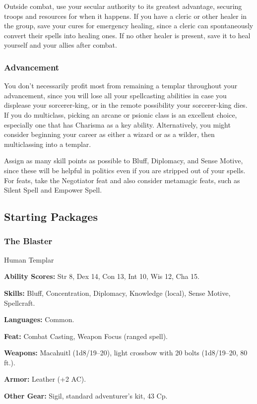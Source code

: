 Outside combat, use your secular authority to its greatest advantage, securing troops and resources for when it happens. If you have a cleric or other healer in the group, save your cures for emergency healing, since a cleric can spontaneously convert their spells into healing ones. If no other healer is present, save it to heal yourself and your allies after combat.

\subsubsection{Advancement}
You don't necessarily profit most from remaining a templar throughout your advancement, since you will lose all your spellcasting abilities in case you displease your sorcerer‐king, or in the remote possibility your sorcerer‐king dies. If you do multiclass, picking an arcane or psionic class is an excellent choice, especially one that has Charisma as a key ability. Alternatively, you might consider beginning your career as either a wizard or as a wilder, then multiclassing into a templar.

Assign as many skill points as possible to Bluff, Diplomacy, and Sense Motive, since these will be helpful in politics even if you are stripped out of your spells. For feats, take the Negotiator feat and also consider metamagic feats, such as Silent Spell and Empower Spell.

\subsection{Starting Packages}
\subsubsection{The Blaster}
Human Templar

\textbf{Ability Scores:} Str 8, Dex 14, Con 13, Int 10, Wis 12, Cha 15.

\textbf{Skills:} Bluff, Concentration, Diplomacy, Knowledge (local), Sense Motive, Spellcraft.

\textbf{Languages:} Common.

\textbf{Feat:} Combat Casting, Weapon Focus (ranged spell).

\textbf{Weapons:} Macahuitl (1d8/19–20), light crossbow with 20 bolts (1d8/19–20, 80 ft.).

\textbf{Armor:} Leather (+2 AC).

\textbf{Other Gear:} Sigil, standard adventurer's kit, 43 Cp.

